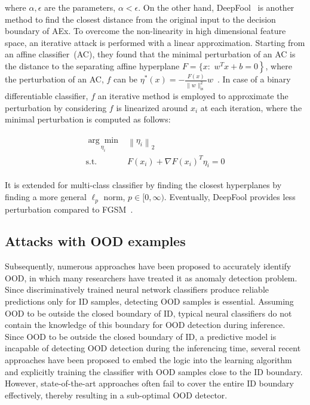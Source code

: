 \hspace*{3.5mm} where $\alpha, \epsilon$ are the parameters, $\alpha<\epsilon$. On the other hand, DeepFool~\cite{moosavi2016deepfool} is another method to find the closest distance from the original input to the decision boundary of AEx. To overcome the non-linearity in high dimensional feature space, an iterative attack is performed with a linear approximation. Starting from an affine classifier~(AC), they found that the minimal perturbation of an AC is the distance to the separating affine hyperplane ${F}=\{x:$ $\left.w^{T} x+b=0\right\}$, where the perturbation of an AC, $f$ can be $\eta^{*}(x)=-\frac{F(x)}{\|w\|_{\text {is }}^{2}} w$~\cite{yuan2019adversarial}. In case of a binary differentiable classifier, $f$ an iterative method is employed to approximate the perturbation by considering $f$ is linearized around $x_{i}$ at each iteration, where the minimal perturbation is computed as follows:
 
\vspace{-6mm}
\begin{align}
    \begin{array}{ll}
    \underset{\eta_{i}}{\arg \min } & \left\|\eta_{i}\right\|_{2} \\
    \text {s.t.} & F\left(x_{i}\right)+\nabla F\left(x_{i}\right)^{T} \eta_{i}=0
    \end{array}
\end{align}

\hspace*{3.5mm} It is extended for multi-class classifier by finding the closest hyperplanes by finding a more general $\ell_{p}$ norm, $p \in[0, \infty)$. Eventually, DeepFool provides less perturbation compared to FGSM~\cite{yuan2019adversarial}.

\subsection{Attacks with OOD examples}
Subsequently, numerous approaches have been proposed to accurately identify OOD, in which many researchers have treated it as anomaly detection problem. Since discriminatively trained neural network classifiers produce reliable predictions only for ID samples, detecting OOD samples is essential. Assuming OOD to be outside the closed boundary of ID, typical neural classifiers do not contain the knowledge of this boundary for OOD detection during inference. Since OOD to be outside the closed boundary of ID, a predictive model is incapable of detecting OOD detection during the inferencing time, several recent approaches have been proposed to embed the logic into the learning algorithm and explicitly training the classifier with OOD samples close to the ID boundary. However, state-of-the-art approaches often fail to cover the entire ID boundary effectively, thereby resulting in a sub-optimal OOD detector. 

